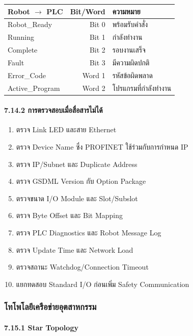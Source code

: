 \begin{table}[htbp]
    \centering
    \begin{tabular}{l r l}
        \hline
        \textbf{Robot \(\to\) PLC} & \textbf{Bit/Word} & \textbf{ความหมาย} \\
        \hline
        Robot\_Ready & Bit 0 & พร้อมรับคำสั่ง \\
        Running & Bit 1 & กำลังทำงาน \\
        Complete & Bit 2 & รอบงานเสร็จ \\
        Fault & Bit 3 & มีความผิดปกติ \\
        Error\_Code & Word 1 & รหัสข้อผิดพลาด \\
        Active\_Program & Word 2 & โปรแกรมที่กำลังทำงาน \\
        \hline
    \end{tabular}
\end{table}

\paragraph{7.14.2 การตรวจสอบเมื่อสื่อสารไม่ได้}

\begin{enumerate}
    \item ตรวจ Link LED และสาย Ethernet
    \item ตรวจ Device Name ซึ่ง PROFINET ใช้ร่วมกับการกำหนด IP
    \item ตรวจ IP/Subnet และ Duplicate Address
    \item ตรวจ GSDML Version กับ Option Package
    \item ตรวจขนาด I/O Module และ Slot/Subslot
    \item ตรวจ Byte Offset และ Bit Mapping
    \item ตรวจ PLC Diagnostics และ Robot Message Log
    \item ตรวจ Update Time และ Network Load
    \item ตรวจสถานะ Watchdog/Connection Timeout
    \item แยกทดสอบ Standard I/O ก่อนเพิ่ม Safety Communication
\end{enumerate}



\subsubsection{โทโพโลยีเครือข่ายอุตสาหกรรม}

\paragraph{7.15.1 Star Topology}

